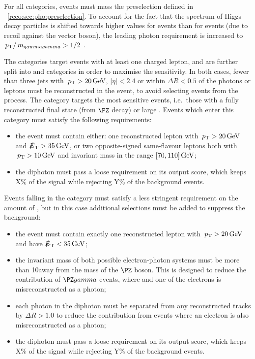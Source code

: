 For all \VHTag categories, events must mass the preselection defined in \Sec~\ref{reco:sec:pho:preselection}. To account for the fact that the \pT spectrum of Higgs decay particles is shifted towards higher values for \VH events than for \ggH events (due to recoil against the vector boson), the leading photon \pT requirement is increased to $\,p_\text{T}/\,m_{gammagamma} >1/2$ .

The \VHLeptonicTag categories target events with at least one charged lepton, and are further split into \VHLooseLeptonicTag and \VHTightLeptonicTag categories in order to maximise the sensitivity. In both cases, fewer than three jets with $\,p_\text{T}>20\,\text{Ge\hspace{-.08em}V}$, $|\eta|<2.4$ or within $\Delta R <0.5$ of the photons or leptons must be reconstructed in the event, to avoid selecting events from the \ttH process. The \VHTightLeptonicTag category targets the most sensitive events, i.e.~those with a fully reconstructed final state (from $\PZ$ decay) or large \MET. Events which enter this category must satisfy the following requirements:
\begin{itemize}
\item the event must contain either: one reconstructed lepton with $\,p_\text{T}>20\,\text{Ge\hspace{-.08em}V}$ and $\slashed{E}_{\mathrm{T}} > 35\,\text{Ge\hspace{-.08em}V}$, or two opposite-signed same-flavour leptons both with $\,p_\text{T}>10\,\text{Ge\hspace{-.08em}V}$ and invariant mass in the range $[70,110]\,\text{Ge\hspace{-.08em}V}$;
\item the diphoton must pass a loose requirement on its \DiPhoBdt output score, which keeps X\% of the signal while rejecting Y\% of the background events.
\end{itemize}

Events falling in the \VHLooseLeptonicTag category must satisfy a less stringent requirement on the amount of \MET, but in this case additional selections must be added to suppress the \SM background:
\begin{itemize}
\item the event must contain exactly one reconstructed lepton with $\,p_\text{T}>20\,\text{Ge\hspace{-.08em}V}$ and have $\slashed{E}_{\mathrm{T}} < 35\,\text{Ge\hspace{-.08em}V}$;
\item the invariant mass of both possible electron-photon systems must be more than 10\GeV away from the mass of the $\PZ$ boson. This is designed to reduce the contribution of $\PZ\gamma$ events, where \Zee and one of the electrons is misreconstructed as a photon; 
\item each photon in the diphoton must be separated from any reconstructed tracks by $\Delta R >1.0$ to reduce the contribution from \DY events where an electron is also misreconstructed as a photon;
\item the diphoton must pass a loose requirement on its \DiPhoBdt output score, which keeps X\% of the signal while rejecting Y\% of the background events.
\end{itemize}

